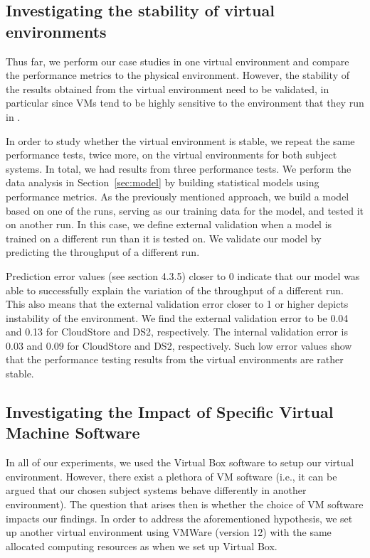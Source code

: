 \documentclass[smallextended]{svjour3}       %
\begin{document}
\subsection{Investigating the stability of virtual environments}

Thus far, we perform our case studies in one virtual environment and compare the performance metrics to the physical environment. However, the stability of the results obtained from the virtual environment need to be validated, in particular since VMs tend to be highly sensitive to the environment that they run in \cite{leitner}.
 

In order to study whether the virtual environment is stable, we repeat the same performance tests, twice more, on the virtual environments for both subject systems. In total, we had results from three performance tests. We perform the data analysis in Section~\ref{sec:model} by building statistical models using performance metrics. %
As the previously mentioned approach, we build a model based on one of the runs, serving as our training data for the model, and tested it on another run. In this case, we define external validation when a model is trained on a different run than it is tested on. We validate our model by predicting the throughput of a different run.  

Prediction error values (see section 4.3.5) closer to 0 indicate that our model was able to successfully explain the variation of the throughput of a different run. This also means that the external validation error closer to 1 or higher depicts instability of the environment. We find the external validation error to be 0.04 and 0.13 for CloudStore and DS2, respectively. The internal validation error is 0.03 and 0.09 for CloudStore and DS2, respectively. Such low error values show that the performance testing results from the virtual environments are rather stable. 

\subsection{Investigating the Impact of Specific Virtual Machine Software}

In all of our experiments, we used the Virtual Box software to setup our virtual environment. However, there exist a plethora of VM software (i.e., it can be argued that our chosen subject systems behave differently in another environment). The question that arises then is whether the choice of VM software impacts our findings. In order to address the aforementioned hypothesis, we set up another virtual environment using VMWare (version 12) with the same allocated computing resources as when we set up Virtual Box.
\end{document}
